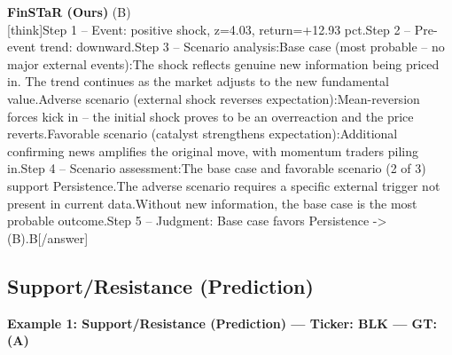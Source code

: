 \begin{minipage}[t]{0.41\textwidth}
\colorbox{green!10}{\parbox{\dimexpr\textwidth-2\fboxsep}{
\textbf{FinSTaR (Ours)} \textcolor{green!50!black}{(B)} \\[2pt]
\tiny
[think]\newline Step 1 -- Event: positive shock, z=4.03, return=+12.93 pct.\newline Step 2 -- Pre-event trend: downward.\newline Step 3 -- Scenario analysis:\newline   Base case (most probable -- no major external events):\newline     The shock reflects genuine new information being priced in. The trend continues as the market adjusts to the new fundamental value.\newline   Adverse scenario (external shock reverses expectation):\newline     Mean-reversion forces kick in -- the initial shock proves to be an overreaction and the price reverts.\newline   Favorable scenario (catalyst strengthens expectation):\newline     Additional confirming news amplifies the original move, with momentum traders piling in.\newline Step 4 -- Scenario assessment:\newline   The base case and favorable scenario (2 of 3) support Persistence.\newline   The adverse scenario requires a specific external trigger not present in current data.\newline   Without new information, the base case is the most probable outcome.\newline Step 5 -- Judgment: Base case favors Persistence -> (B).\newline [/think]\newline [answer]B[/answer]
}}
\vspace{-30pt}
\end{minipage}

\clearpage
\subsection{Support/Resistance (Prediction)}


\noindent
\textbf{Example 1: Support/Resistance (Prediction) --- Ticker: BLK --- GT: (A)}
\vspace{2pt}

